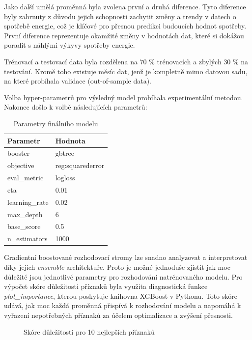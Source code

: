 \documentclass[FM,BP,fonts]{tulthesis}
\begin{document}
Jako další umělá proměnná byla zvolena první a druhá diference. Tyto diference byly zahrnuty z důvodu jejich schopnosti zachytit změny a trendy v datech o spotřebě energie, což je klíčové pro přesnou predikci budoucích hodnot spotřeby. První diference reprezentuje okamžité změny v hodnotách dat, které si dokážou poradit s náhlými výkyvy spotřeby energie. 

Trénovací a testovací data byla rozdělena na 70 \% trénovacích a zbylých 30 \% na testování. Kromě toho existuje měsíc dat, jenž je kompletně mimo datovou sadu, na které probíhala validace (out-of-sample data). 


Volba hyper-parametrů pro výsledný model probíhala experimentální metodou. Nakonec došlo k volbě následujících parametrů:

\begin{table}[!ht]
	\centering
	\caption{Parametry finálního modelu}
	
	\begin{tabularx}{\linewidth}{lX}
		\hline
		\textbf{Parametr} & \textbf{Hodnota} \\ \hline
		booster & gbtree \\
	    objective & reg:squarederror \\
		eval\_metric & logloss \\
		eta & 0.01 \\
		learning\_rate & 0.02 \\
		max\_depth & 6\\
		base\_score  & 0.5\\
		n\_estimators  & 1000\\
	\end{tabularx}
\end{table}

Gradientní boostované rozhodovací stromy lze snadno analyzovat a interpretovat díky jejich \textit{ensemble} architektuře. Proto je možné jednoduše zjistit jak moc důležité jsou jednotlivé parametry pro rozhodování natrénovaného modelu. Pro výpočet skóre důležitosti příznaků byla využita diagnostická funkce \textit{plot\_importance}, kterou poskytuje knihovna XGBoost v Pythonu. Toto skóre udává, jak moc každá proměnná přispívá k rozhodování modelu a napomáhá k vyřazení nepotřebných příznaků za účelem optimalizace a zvýšení přesnosti. 
 
 \begin{figure}[htbp]
 	\centering
 	\caption{Skóre důležitosti pro 10 nejlepších příznaků}
 	\label{fig:xgboost_f_score}
 \end{figure}
 
\end{document}
